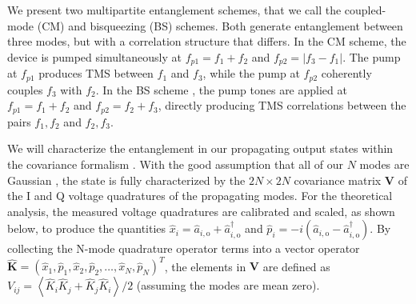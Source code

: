 \documentclass[prl,10pt,twocolumn,superscriptaddress,notitlepage,floatfix,amssymb]{revtex4}
\newcommand*{\cre}[2][a]{\hat{#1}_{#2}^{\dagger}}	%
\newcommand*{\ann}[2][a]{\hat{#1}_{#2}}
\begin{document}
We present two multipartite entanglement schemes, that we call the coupled-mode (CM) and bisqueezing (BS) schemes. Both  generate entanglement between three modes, but with a correlation structure that differs. In the CM scheme, the device is pumped simultaneously at $f_{p1}= f_1 + f_2$  and $f_{p2}=|f_3-f_1|$.  The pump at $f_{p1}$ produces TMS between $f_1$ and $f_3$,  while the pump at $f_{p2}$ coherently couples $f_3$ with $f_2$.  In the BS scheme \cite{Bruschi:2017jy}, the pump tones are applied at $f_{p1}=f_1 + f_2 $ and $f_{p2}=f_2+f_3$, directly producing TMS correlations between the pairs $f_1,f_2$ and $f_2,f_3$. 


We will characterize the entanglement in our propagating output states within the covariance formalism \cite{Simon:1994gb}.  With the good assumption that all of our $N$ modes are Gaussian \cite{Note1}, the state is fully characterized by the $2N \times 2N$ covariance matrix $\mathbf{V}$ of the I and Q voltage quadratures of the propagating modes. For the theoretical analysis, the measured voltage quadratures are calibrated and scaled, as shown below, to produce the quantities $\ann[x]{i}=\ann[a]{i,\text{o}}+\cre[a]{i,\text{o}}$ and $\ann[p]{i}=-i\left(\ann[a]{i,\text{o}}-\cre[a]{i,\text{o}}\right)$.  By collecting the N-mode quadrature operator terms into a vector operator $\mathbf{\hat{K}}=\left(\ann[x]{1},\ann[p]{1},\ann[x]{2},\ann[p]{2},\dots,\ann[x]{N},\ann[p]{N}\right)^T$, the elements in $\mathbf{V}$ are defined as $V_{ij}=\left\langle \hat{K}_i\hat{K}_j +  \hat{K}_j\hat{K}_i\right\rangle/2$ (assuming the modes are mean zero).
\end{document}
